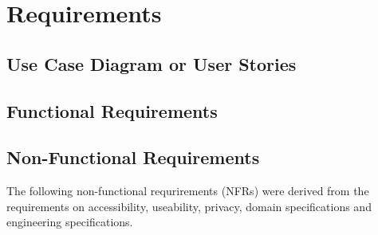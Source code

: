 \chapter{Requirements}

\section {Use Case Diagram or User Stories}

\section{Functional Requirements}

\begin{table}[h!]
    \label{tab:UCTable}
\end{table}
\pagebreak

\section {Non-Functional Requirements}
The following non-functional requrirements (NFRs) were derived from the requirements on accessibility, useability, privacy, domain specifications and engineering specifications.
    
\begin{table}[h!]
    \label{tab:NFRs}
\end{table}
